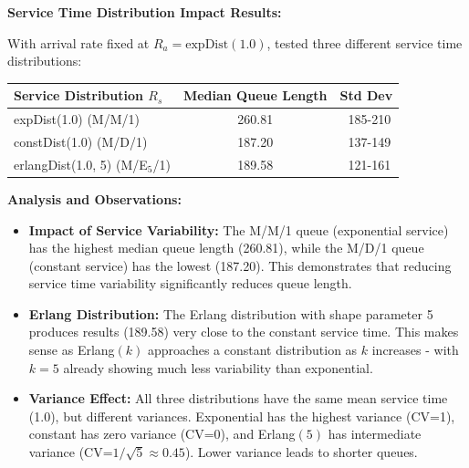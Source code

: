 \documentclass{article}
\newenvironment{answer}
{\color{blue}}
{\normalfont}
\begin{document}
\begin{enumerate}
\begin{enumerate}
                    \begin{answer}
                        \textbf{Service Time Distribution Impact Results:}

                        With arrival rate fixed at $R_a = \text{expDist}(1.0)$, tested three different service time distributions:

                        \begin{center}
                            \begin{tabular}{|l|c|c|}
                                \hline
                                \textbf{Service Distribution $R_s$} & \textbf{Median Queue Length} & \textbf{Std Dev} \\
                                \hline
                                expDist(1.0) (M/M/1)                & 260.81                       & ~185-210         \\
                                \hline
                                constDist(1.0) (M/D/1)              & 187.20                       & ~137-149         \\
                                \hline
                                erlangDist(1.0, 5) (M/E$_5$/1)      & 189.58                       & ~121-161         \\
                                \hline
                            \end{tabular}
                        \end{center}

                        \textbf{Analysis and Observations:}
                        \begin{itemize}
                            \item \textbf{Impact of Service Variability:} The M/M/1 queue (exponential service) has the highest median queue length (260.81), while the M/D/1 queue (constant service) has the lowest (187.20). This demonstrates that reducing service time variability significantly reduces queue length.

                            \item \textbf{Erlang Distribution:} The Erlang distribution with shape parameter 5 produces results (189.58) very close to the constant service time. This makes sense as Erlang$(k)$ approaches a constant distribution as $k$ increases - with $k=5$ already showing much less variability than exponential.

                            \item \textbf{Variance Effect:} All three distributions have the same mean service time (1.0), but different variances. Exponential has the highest variance (CV=1), constant has zero variance (CV=0), and Erlang$(5)$ has intermediate variance (CV=$1/\sqrt{5} \approx 0.45$). Lower variance leads to shorter queues.


\end{itemize}
\end{answer}
\end{enumerate}
\end{enumerate}
\end{document}
